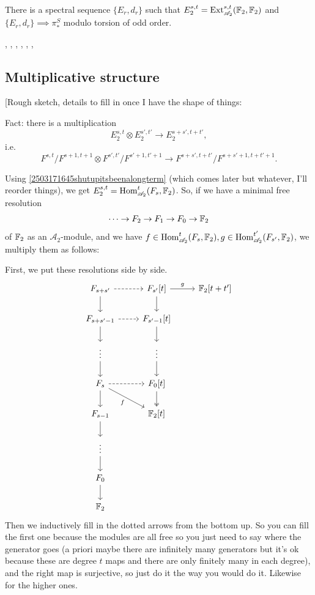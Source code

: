 \documentclass{MetricNotes2023}
\def\bb{\ensuremath\mathbb}
\def\A{\ensuremath{\mathscr{A}_2}}
\DeclareMathOperator{\Ext}{Ext}
\DeclareMathOperator{\Hom}{Hom}
\begin{document}
\begin{theorem}
There is a spectral sequence \(\{E_r, d_r\}\) such that \(E_2^{s,t}=\Ext_{\A}^{s,t}(\bb{F}_2, \bb{F}_2)\) and \(\{E_r, d_r\}\implies \pi_*^S\) modulo torsion of odd order. 
\end{theorem}



\autocite{spectral_sequences}, \autocite{stable_homotopy}, \autocite{cobordism}, \autocite{foundations}, \autocite{hatcher5}, \autocite{ass}, \autocite{primer}

\subsection{Multiplicative structure}

[Rough sketch, details to fill in once I have the shape of things:

Fact: there is a multiplication 
\[E^{s,t}_2\otimes E^{s',t'}_2\to E^{s+s', t+t'}_2,\]
i.e. 
\[F^{s,t}/F^{s+1, t+1}\otimes F^{s',t'}/F^{s'+1, t'+1}\to F^{s+s', t+t'}/F^{s+s'+1, t+t'+1}.\]

Using \ref{2503171645shutupitsbeenalongterm} (which comes later but whatever, I'll reorder things), we get \(E_2^{s,t}=\Hom^t_{\A}(F_s, \bb{F}_2)\). So, if we have a minimal free resolution 
\[\cdots \to F_2 \to F_1 \to F_0 \to \bb{F}_2\]
of \(\bb{F}_2\) as an \(\A\)-module, and we have \(f \in \Hom^t_{\A}(F_s, \bb{F}_2), g \in \Hom^{t'}_{\A}(F_{s'}, \bb{F}_2)\), we multiply them as follows:

First, we put these resolutions side by side.
\[\begin{tikzcd}
F_{s+s'} \arrow[r, dashrightarrow,""] \arrow[d, swap, ""]  & F_{s'}[t]  \arrow[d, ""] \arrow[r, "g"] & \bb{F}_2[t+t']  \\
F_{s+s'-1} \arrow[r, dashrightarrow, ""] \arrow[d, ""] & F_{s'-1}[t] \arrow[d, ""] & \\
\vdots \arrow[d, ""] & \vdots \arrow[d, ""] &   \\
F_s \arrow[r, dashrightarrow, ""] \arrow[d, ""] \arrow[rd, "f"'] & F_0[t]  \arrow[d, twoheadrightarrow, ""] &   \\ 
F_{s-1} \arrow[d] & \bb{F}_2[t] & \\
\vdots \arrow[d] & & \\
F_0  \arrow[d] & & \\
\bb{F}_2 & & 
\end{tikzcd}\]
Then we inductively fill in the dotted arrows from the bottom up. So you can fill the first one because the modules are all free so you just need to say where the generator goes (a priori maybe there are infinitely many generators but it's ok because these are degree \(t\) maps and there are only finitely many in each degree), and the right map is surjective, so just do it the way you would do it. Likewise for the higher ones. 
\end{document}
